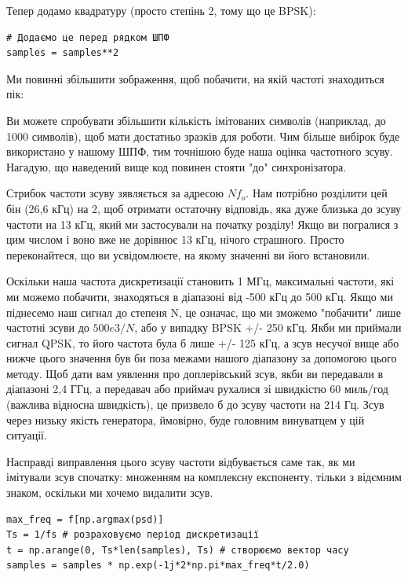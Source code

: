 Тепер додамо квадратуру (просто степінь 2, тому що це BPSK):

\begin{Verbatim}[breaklines=true,breakanywhere=true,fontsize=\small]
# Додаємо це перед рядком ШПФ
samples = samples**2
\end{Verbatim}

Ми повинні збільшити зображення, щоб побачити, на якій частоті
знаходиться пік:

\href{../_images/coarse-freq-sync.svg}{}

Ви можете спробувати збільшити кількість імітованих символів (наприклад,
до 1000 символів), щоб мати достатньо зразків для роботи. Чим більше
вибірок буде використано у нашому ШПФ, тим точнішою буде наша оцінка
частотного зсуву. Нагадую, що наведений вище код повинен стояти "до"
синхронізатора.

Стрибок частоти зсуву з\textquotesingle являється за адресою \(Nf_o\).
Нам потрібно розділити цей бін (26,6 кГц) на 2, щоб отримати остаточну
відповідь, яка дуже близька до зсуву частоти на 13 кГц, який ми
застосували на початку розділу! Якщо ви погралися з цим числом і воно
вже не дорівнює 13 кГц, нічого страшного. Просто переконайтеся, що ви
усвідомлюєте, на якому значенні ви його встановили.

Оскільки наша частота дискретизації становить 1 МГц, максимальні
частоти, які ми можемо побачити, знаходяться в діапазоні від -500 кГц до
500 кГц. Якщо ми піднесемо наш сигнал до степеня N, це означає, що ми
зможемо "побачити" лише частотні зсуви до \(500e3/N\), або у випадку
BPSK +/- 250 кГц. Якби ми приймали сигнал QPSK, то його частота була б
лише +/- 125 кГц, а зсув несучої вище або нижче цього значення був би
поза межами нашого діапазону за допомогою цього методу. Щоб дати вам
уявлення про доплерівський зсув, якби ви передавали в діапазоні 2,4 ГГц,
а передавач або приймач рухалися зі швидкістю 60 миль/год (важлива
відносна швидкість), це призвело б до зсуву частоти на 214 Гц. Зсув
через низьку якість генератора, ймовірно, буде головним винуватцем у цій
ситуації.

Насправді виправлення цього зсуву частоти відбувається саме так, як ми
імітували зсув спочатку: множенням на комплексну експоненту, тільки з
від\textquotesingle ємним знаком, оскільки ми хочемо видалити зсув.

\begin{Verbatim}[breaklines=true,breakanywhere=true,fontsize=\small]
max_freq = f[np.argmax(psd)]
Ts = 1/fs # розраховуємо період дискретизації
t = np.arange(0, Ts*len(samples), Ts) # створюємо вектор часу
samples = samples * np.exp(-1j*2*np.pi*max_freq*t/2.0)
\end{Verbatim}

